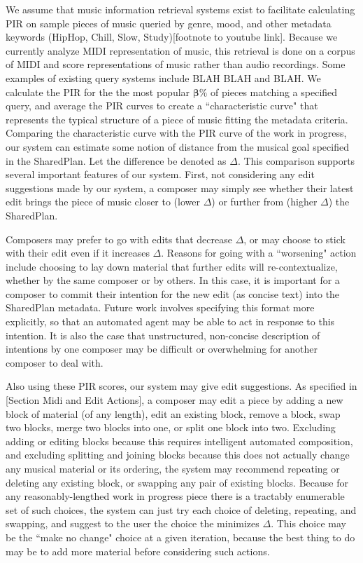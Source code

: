 \documentclass[final,authoryear,5p,times,twocolumn]{elsarticle}
\begin{document}
We assume that music information retrieval systems exist to facilitate calculating PIR on sample pieces of music queried by genre, mood, and other metadata keywords (HipHop, Chill, Slow, Study)[footnote to youtube link]. Because we currently analyze MIDI representation of music, this retrieval is done on a corpus of MIDI and score representations of music rather than audio recordings. Some examples of existing query systems include BLAH BLAH and BLAH. We calculate the PIR for the the most popular $\boldsymbol{\beta}\%$ of pieces matching a specified query, and average the PIR curves to create a ``characteristic curve" that represents the typical structure of a piece of music fitting the metadata criteria. 
Comparing the characteristic curve with the PIR curve of the work in progress, our system can estimate some notion of distance from the musical goal specified in the SharedPlan. Let the difference be denoted as $\Delta$. This comparison supports several important features of our system. First, not considering any edit suggestions made by our system, a composer may simply see whether their latest edit brings the piece of music closer to (lower $\Delta$) or further from (higher $\Delta$) the SharedPlan.  

Composers may prefer to go with edits that decrease $\Delta$, or may choose to stick with their edit even if it increases $\Delta$. Reasons for going with a ``worsening" action include choosing to lay down material that further edits will re-contextualize, whether by the same composer or by others. In this case, it is important for a composer to commit their intention for the new edit (as concise text) into the SharedPlan metadata. Future work involves specifying this format more explicitly, so that an automated agent may be able to act in response to this intention. It is also the case that unstructured, non-concise description of intentions by one composer may be difficult or overwhelming for another composer to deal with.

Also using these PIR scores, our system may give edit suggestions. As specified in [Section Midi and Edit Actions], a composer may edit a piece by adding a new block of material (of any length), edit an existing block, remove a block, swap two blocks, merge two blocks into one, or split one block into two. Excluding adding or editing blocks because this requires intelligent automated composition, and excluding splitting and joining blocks because this does not actually change any musical material or its ordering, the system may recommend repeating or deleting any existing block, or swapping any pair of existing blocks. Because for any reasonably-lengthed work in progress piece there is a tractably enumerable set of such choices, the system can just try each choice of deleting, repeating, and swapping, and suggest to the user the choice the minimizes $\Delta$. This choice may be the ``make no change" choice at a given iteration, because the best thing to do may be to add more material before considering such actions.
\end{document}
